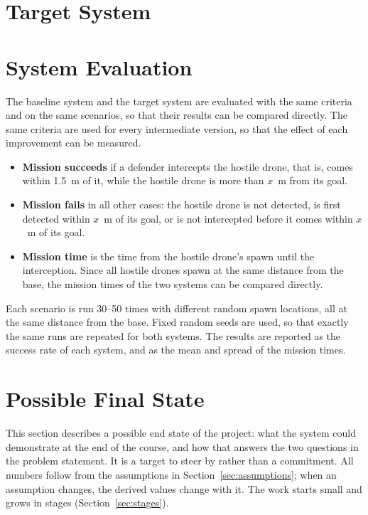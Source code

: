 \documentclass{article}
\begin{document}
\newpage
\section{Target System}

\newpage
\section{System Evaluation}\label{sec:evaluation}
The baseline system and the target system are evaluated with the same
criteria and on the same scenarios, so that their results can be compared
directly. The same criteria are used for every intermediate version, so
that the effect of each improvement can be measured.

\begin{itemize}
    \item \textbf{Mission succeeds} if a defender intercepts the hostile
          drone, that is, comes within 1.5~m of it, while the hostile drone
          is more than $x$~m from its goal.
    \item \textbf{Mission fails} in all other cases: the hostile drone is
          not detected, is first detected within $x$~m of its goal, or is
          not intercepted before it comes within $x$~m of its goal.
    \item \textbf{Mission time} is the time from the hostile drone's spawn
          until the interception. Since all hostile drones spawn at the same
          distance from the base, the mission times of the two systems can
          be compared directly.
\end{itemize}

Each scenario is run 30--50 times with different random spawn locations, all
at the same distance from the base. Fixed random seeds are used, so that
exactly the same runs are repeated for both systems. The results are
reported as the success rate of each system, and as the mean and spread of
the mission times.


\newpage

\section{Possible Final State}
\label{sec:final-state}

This section describes a possible end state of the project: what the system
could demonstrate at the end of the course, and how that answers the two
questions in the problem statement. It is a target to steer by rather than a
commitment. All numbers follow from the assumptions in
Section~\ref{sec:assumptions}; when an assumption changes, the derived values
change with it. The work starts small and grows in stages
(Section~\ref{sec:stages}).
\end{document}
